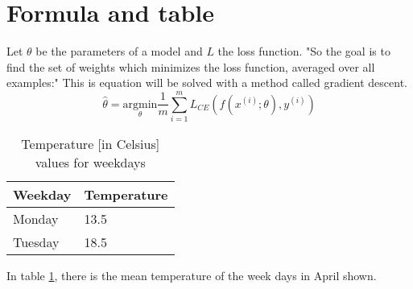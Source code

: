 \documentclass{article}
\begin{document}
\section{Formula and table}
Let $\theta$ be the parameters of a model and $L$ the loss function. "So the goal is to find the set of weights which minimizes the loss function, averaged over all examples:"\cite[p.~83]{jurafskySpeechLanguageProcessing2014} This is equation will be solved with a method called gradient descent.
\begin{equation}
	\hat{\theta} = \underset{\theta}{\mathrm{argmin}} \frac{1}{m} \sum_{i=1}^{m}L_{CE}(f(x^{(i)}; \theta),y^{(i)})
	\label{eq:gradient-descent}
\end{equation}


\begin{table}[ht]
	\centering
	\begin{tabular}{@{}ll@{}}
		\toprule
		Weekday & Temperature \\
		\midrule
		Monday & 13.5 \\
		Tuesday & 18.5 \\ \bottomrule
	\end{tabular}
	\caption{Temperature [in Celsius] values for weekdays}
	\label{tab:my-table1}
\end{table}

In table \ref{tab:my-table1}, there is the mean temperature of the week days in April shown. 

\newpage

\end{document}
